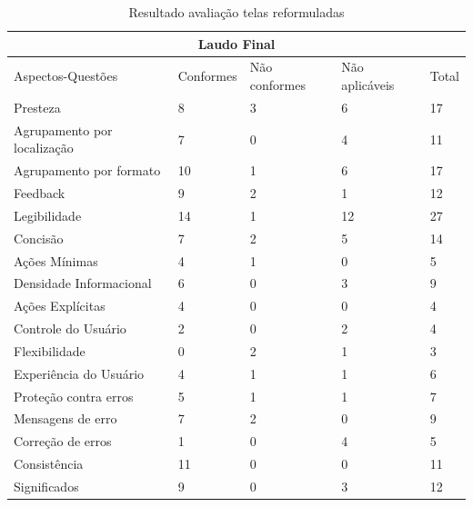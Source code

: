 \begin{table}[H]
\begin{tabular}{|l|l|l|l|l|}
\hline
\multicolumn{5}{|c|}{\textbf{Laudo Final}}                                       \\ \hline
Aspectos-Questões           & Conformes & Não conformes & Não aplicáveis & Total \\ \hline
Presteza                    & 8         & 3             & 6              & 17    \\ \hline
Agrupamento por localização & 7         & 0             & 4              & 11    \\ \hline
Agrupamento por formato     & 10        & 1             & 6              & 17    \\ \hline
Feedback                    & 9         & 2             & 1              & 12    \\ \hline
Legibilidade                & 14        & 1             & 12             & 27    \\ \hline
Concisão                    & 7         & 2             & 5              & 14    \\ \hline
Ações Mínimas               & 4         & 1             & 0              & 5     \\ \hline
Densidade Informacional     & 6         & 0             & 3              & 9     \\ \hline
Ações Explícitas            & 4         & 0             & 0              & 4     \\ \hline
Controle do Usuário         & 2         & 0             & 2              & 4     \\ \hline
Flexibilidade               & 0         & 2             & 1              & 3     \\ \hline
Experiência do Usuário      & 4         & 1             & 1              & 6     \\ \hline
Proteção contra erros       & 5         & 1             & 1              & 7     \\ \hline
Mensagens de erro           & 7         & 2             & 0              & 9     \\ \hline
Correção de erros           & 1         & 0             & 4              & 5     \\ \hline
Consistência                & 11        & 0             & 0              & 11    \\ \hline
Significados                & 9         & 0             & 3              & 12    \\ \hline
\end{tabular}
\caption{Resultado avaliação telas reformuladas}
\end{table}

